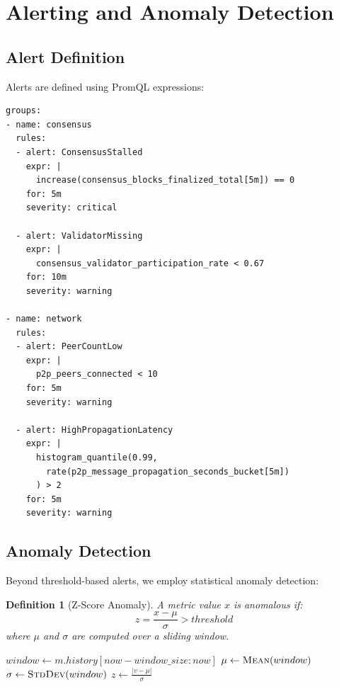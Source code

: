 \documentclass[11pt,a4paper]{article}
\newtheorem{definition}{Definition}
\begin{document}
\section{Alerting and Anomaly Detection}

\subsection{Alert Definition}

Alerts are defined using PromQL expressions:

\begin{lstlisting}
groups:
- name: consensus
  rules:
  - alert: ConsensusStalled
    expr: |
      increase(consensus_blocks_finalized_total[5m]) == 0
    for: 5m
    severity: critical

  - alert: ValidatorMissing
    expr: |
      consensus_validator_participation_rate < 0.67
    for: 10m
    severity: warning

- name: network
  rules:
  - alert: PeerCountLow
    expr: |
      p2p_peers_connected < 10
    for: 5m
    severity: warning

  - alert: HighPropagationLatency
    expr: |
      histogram_quantile(0.99,
        rate(p2p_message_propagation_seconds_bucket[5m])
      ) > 2
    for: 5m
    severity: warning
\end{lstlisting}

\subsection{Anomaly Detection}

Beyond threshold-based alerts, we employ statistical anomaly detection:

\begin{definition}[Z-Score Anomaly]
A metric value $x$ is anomalous if:
\[
z = \frac{x - \mu}{\sigma} > threshold
\]
where $\mu$ and $\sigma$ are computed over a sliding window.
\end{definition}

\begin{algorithm}
\caption{Sliding Window Anomaly Detection}
\begin{algorithmic}[1]
    \State $window \gets m.history[now - window\_size : now]$
    \State $\mu \gets \Call{Mean}{window}$
    \State $\sigma \gets \Call{StdDev}{window}$
    \State $z \gets \frac{|v - \mu|}{\sigma}$
        \State \Return {}
    \EndIf
\EndProcedure
\end{algorithmic}
\end{algorithm}
\end{document}
